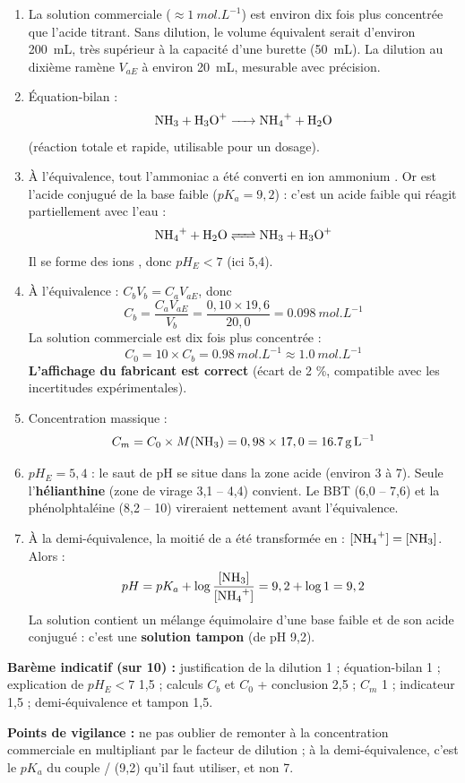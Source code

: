 \documentclass[11pt]{article}
\begin{document}
\begin{corrige}
\begin{enumerate}
\item La solution commerciale ($\approx \SI{1}{mol.L^{-1}}$) est environ dix fois plus concentrée que l'acide titrant. Sans dilution, le volume équivalent serait d'environ \SI{200}{mL}, très supérieur à la capacité d'une burette (\SI{50}{mL}). La dilution au dixième ramène $V_{aE}$ à environ \SI{20}{mL}, mesurable avec précision.
\item Équation-bilan :
\[ \ce{NH3 + H3O+ -> NH4+ + H2O} \]
(réaction totale et rapide, utilisable pour un dosage).
\item À l'équivalence, tout l'ammoniac a été converti en ion ammonium . Or  est l'acide conjugué de la base faible  ($pK_a = 9,2$) : c'est un acide faible qui réagit partiellement avec l'eau :
\[ \ce{NH4+ + H2O <=> NH3 + H3O+} \]
Il se forme des ions , donc $pH_E < 7$ (ici 5,4).
\item À l'équivalence : $C_b V_b = C_a V_{aE}$, donc
\[ C_b = \frac{C_a V_{aE}}{V_b} = \frac{0,10 \times 19,6}{20,0} = \SI{0,098}{mol.L^{-1}} \]
La solution commerciale est dix fois plus concentrée :
\[ C_0 = 10 \times C_b = \SI{0,98}{mol.L^{-1}} \approx \SI{1,0}{mol.L^{-1}} \]
\textbf{L'affichage du fabricant est correct} (écart de 2 \%, compatible avec les incertitudes expérimentales).
\item Concentration massique :
\[ C_m = C_0 \times M(\ce{NH3}) = 0,98 \times 17,0 = \SI{16,7}{g.L^{-1}} \]
\item $pH_E = 5,4$ : le saut de pH se situe dans la zone acide (environ 3 à 7). Seule l'\textbf{hélianthine} (zone de virage 3,1 -- 4,4) convient. Le BBT (6,0 -- 7,6) et la phénolphtaléine (8,2 -- 10) vireraient nettement avant l'équivalence.
\item À la demi-équivalence, la moitié de  a été transformée en  : $[\ce{NH4+}] = [\ce{NH3}]$. Alors :
\[ pH = pK_a + \log\frac{[\ce{NH3}]}{[\ce{NH4+}]} = 9,2 + \log 1 = 9,2 \]
La solution contient un mélange équimolaire d'une base faible et de son acide conjugué : c'est une \textbf{solution tampon} (de pH 9,2).
\end{enumerate}
\textbf{Barème indicatif (sur 10) :} justification de la dilution 1 ; équation-bilan 1 ; explication de $pH_E < 7$ 1,5 ; calculs $C_b$ et $C_0$ + conclusion 2,5 ; $C_m$ 1 ; indicateur 1,5 ; demi-équivalence et tampon 1,5.

\textbf{Points de vigilance :} ne pas oublier de remonter à la concentration commerciale en multipliant par le facteur de dilution ; à la demi-équivalence, c'est le $pK_a$ du couple / (9,2) qu'il faut utiliser, et non 7.
\end{corrige}
\end{document}
